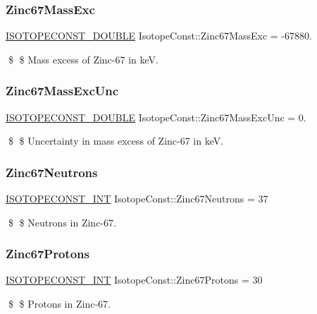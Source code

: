 \subsubsection{\texorpdfstring{Zinc67\+Mass\+Exc}{Zinc67MassExc}}
{\footnotesize\ttfamily \mbox{\hyperlink{group___isotope_const-_macros_ga8f45a7272ce02c0b4c65c44636ed719a}{I\+S\+O\+T\+O\+P\+E\+C\+O\+N\+S\+T\+\_\+\+D\+O\+U\+B\+LE}} Isotope\+Const\+::\+Zinc67\+Mass\+Exc = -\/67880.}

\$ \$ Mass excess of Zinc-\/67 in keV. \mbox{\label{group___isotope_const-_zinc-_zn67_ga7a85f2d714ef8cbbf6e58b5bd88f2e6f}} 
\subsubsection{\texorpdfstring{Zinc67\+Mass\+Exc\+Unc}{Zinc67MassExcUnc}}
{\footnotesize\ttfamily \mbox{\hyperlink{group___isotope_const-_macros_ga8f45a7272ce02c0b4c65c44636ed719a}{I\+S\+O\+T\+O\+P\+E\+C\+O\+N\+S\+T\+\_\+\+D\+O\+U\+B\+LE}} Isotope\+Const\+::\+Zinc67\+Mass\+Exc\+Unc = 0.}

\$ \$ Uncertainty in mass excess of Zinc-\/67 in keV. \mbox{\label{group___isotope_const-_zinc-_zn67_gaea181abc7febeae6e6bc19e7e8f9301b}} 
\subsubsection{\texorpdfstring{Zinc67\+Neutrons}{Zinc67Neutrons}}
{\footnotesize\ttfamily \mbox{\hyperlink{group___isotope_const-_macros_ga5f18360b3e99483a35c32d789e62621c}{I\+S\+O\+T\+O\+P\+E\+C\+O\+N\+S\+T\+\_\+\+I\+NT}} Isotope\+Const\+::\+Zinc67\+Neutrons = 37}

\$ \$ Neutrons in Zinc-\/67. \mbox{\label{group___isotope_const-_zinc-_zn67_ga0892e3b268e34cb00ca749715dfb3684}} 
\subsubsection{\texorpdfstring{Zinc67\+Protons}{Zinc67Protons}}
{\footnotesize\ttfamily \mbox{\hyperlink{group___isotope_const-_macros_ga5f18360b3e99483a35c32d789e62621c}{I\+S\+O\+T\+O\+P\+E\+C\+O\+N\+S\+T\+\_\+\+I\+NT}} Isotope\+Const\+::\+Zinc67\+Protons = 30}

\$ \$ Protons in Zinc-\/67. 